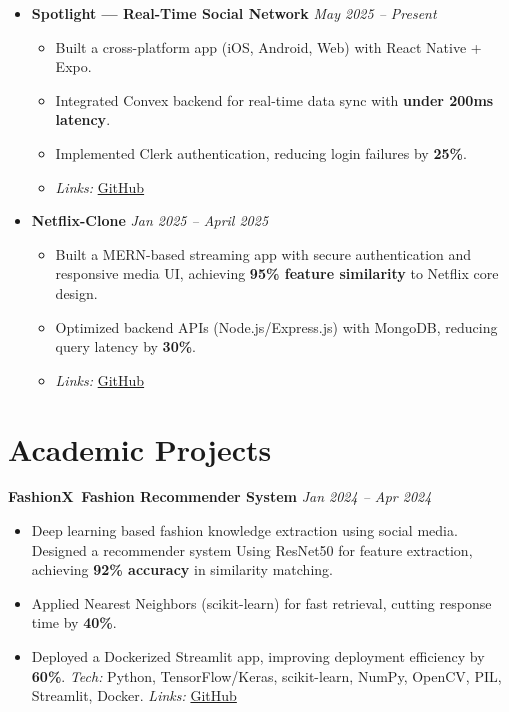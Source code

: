 \documentclass[10pt,a4paper]{article}
\begin{document}
	\begin{itemize}
		\item \textbf{Spotlight — Real-Time Social Network} \hfill \textit{May 2025 -- Present}
		\begin{itemize}
			\item Built a cross-platform app (iOS, Android, Web) with React Native + Expo.  
			\item Integrated Convex backend for real-time data sync with \textbf{under 200ms latency}.  
			\item Implemented Clerk authentication, reducing login failures by \textbf{25\%}.    
			\item \emph{Links:} \href{https://github.com/ValupadasuSaiabbhiram/SPOTLIGHT-APP}{GitHub}
		\end{itemize}
		
		\item \textbf{Netflix-Clone} \hfill \textit{Jan 2025 -- April 2025}
		\begin{itemize}
			\item Built a MERN-based streaming app with secure authentication and responsive media UI, achieving \textbf{95\% feature similarity} to Netflix core design.  
			\item Optimized backend APIs (Node.js/Express.js) with MongoDB, reducing query latency by \textbf{30\%}.  
			\item \emph{Links:} \href{https://github.com/ValupadasuSaiabbhiram/netflix-clone}{GitHub}
		\end{itemize}
			
	\end{itemize}
	

	\section*{Academic Projects}
	
	\textbf{FashionX \textbar \,Fashion Recommender System} \hfill \textit{Jan 2024 -- Apr 2024}
	\begin{itemize}
		\item Deep learning based fashion knowledge extraction using social media. Designed a recommender system Using ResNet50 for feature extraction, achieving \textbf{92\% accuracy} in similarity matching.  
		\item Applied Nearest Neighbors (scikit-learn) for fast retrieval, cutting response time by \textbf{40\%}.  
		\item Deployed a Dockerized Streamlit app, improving deployment efficiency by \textbf{60\%}.  
		\emph{Tech:} Python, TensorFlow/Keras, scikit-learn, NumPy, OpenCV, PIL, Streamlit, Docker.   
		\emph{Links:} \href{https://github.com/ValupadasuSaiabbhiram/FashionX}{GitHub}
	\end{itemize}
	
\end{document}
